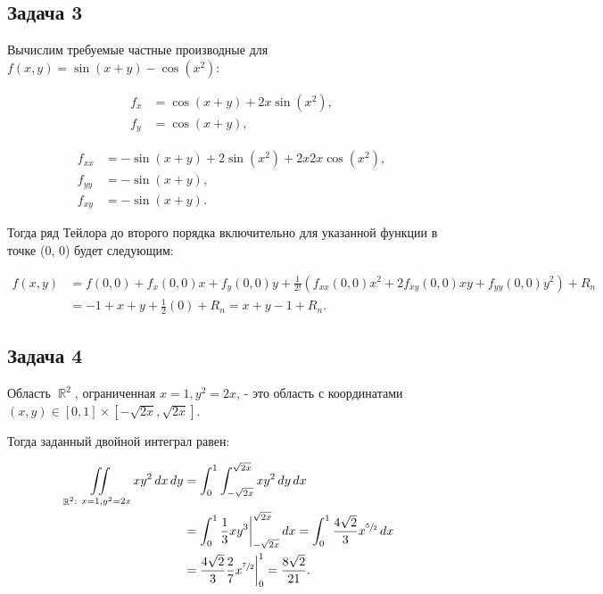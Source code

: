 \documentclass[a4paper,11pt]{article}
\DeclareMathOperator*{\R}{\mathbb{R}}   %
\begin{document}
\subsection{Задача 3}

Вычислим требуемые частные производные для $f(x, y) = \sin (x+y) - \cos (x^2)$:

\begin{minipage}{0.4\linewidth}
\begin{align*}
f_x & = \cos (x+y) + 2x \sin (x^2), \\
f_y & = \cos (x+y),
\end{align*}
\end{minipage}
\begin{minipage}{0.6\linewidth}
	\begin{align*}
f_{xx} & = -\sin (x+y)  + 2 \sin (x^2) + 2x 2x \cos (x^2), \\
f_{yy} & = -\sin (x+y), \\
f_{xy} & = -\sin (x+y).
\end{align*}
\end{minipage}

Тогда ряд Тейлора до второго порядка включительно для указанной функции в точке (0, 0) будет следующим:

\begin{align*}
f(x, y) & = f(0, 0) + f_x(0, 0)x + f_y(0, 0)y + \frac{1}{2!}
  (f_{xx}(0,0)x^2 + 2f_{xy}(0,0)xy + f_{yy}(0,0)y^2) + R_n \\
   & = -1 + x + y + \frac{1}{2}(0) + R_n = x + y - 1 + R_n.
\end{align*}

\subsection{Задача 4}

Область $\R^2$, ограниченная $x = 1, y^2 = 2x$, - это область с координатами $(x, y) \in [0, 1] \times [-\sqrt{2x}, \sqrt{2x}]$.

Тогда заданный двойной интеграл равен:

\begin{align*}
\iint \limits_{\R^2:\ x = 1, y^2 = 2x} xy^2\,dx\,dy 
& = \int_{0}^{1} \int_{-\sqrt{2x}}^{\sqrt{2x}} xy^2\,dy\,dx \\
& = \int_{0}^{1} \frac{1}{3}xy^3 \bigg \rvert_{-\sqrt{2x}}^{\sqrt{2x}} \,dx 
  = \int_{0}^{1} \frac{4\sqrt{2}}{3}x^{\sfrac{5}{2}} \,dx \\
& = \frac{4\sqrt{2}}{3} \frac{2}{7} x^{\sfrac{7}{2}} \bigg \rvert_{0}^{1} = \frac{8\sqrt{2}}{21}.
\end{align*}
\end{document}
